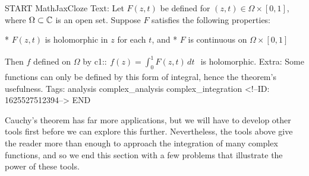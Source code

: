 \documentclass{memoir}
\begin{document}
\begin{anki}
START
MathJaxCloze
Text: Let \(F(z,t)\) be defined for \((z,t) \in \Omega  \times [0,1]\), where \(\Omega \subset \mathbb{C}\) is an open set. Suppose \(F\) satisfies the following properties:

* \(F(z,t)\) is holomorphic in \(z\) for each \(t\), and
* \(F\) is continuous on \(\Omega  \times [0,1]\)

Then \(f\) defined on \(\Omega \) by
 {{c1::\(\begin{align*}
         	f(z) = \int_{0}^{1} F(z,t)\,d t 
         \end{align*}\)}} 
is holomorphic.
Extra: Some functions can only be defined by this form of integral, hence the theorem's usefulness.
Tags: analysis complex_analysis complex_integration
<!--ID: 1625527512394-->
END
\end{anki}

Cauchy's theorem has far more applications, but we will have to develop other tools first before we can explore this further. Nevertheless, the tools above give the reader more than enough to approach the integration of many complex functions, and so we end this section with a few problems that illustrate the power of these tools.

\end{document}
